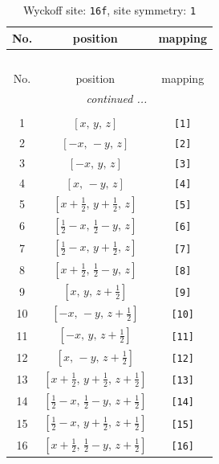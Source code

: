 \documentclass[fleqn,8pt]{jsarticle}
\begin{document}
\begin{longtable}{ccc}
\caption{Wyckoff site: {\tt 16f}, site symmetry: {\tt 1}}
 \\
 \hline \hline
No. & position & mapping \\ \hline \endfirsthead

\multicolumn{2}{l}{\tablename\ \thetable{}} \\
 \hline \hline
No. & position & mapping \\ \hline \endhead

 \hline \hline
\multicolumn{2}{r}{\footnotesize\it continued ...} \\ \endfoot

 \hline \hline
\multicolumn{2}{r}{} \\ \endlastfoot

1 & $\left[ x,\, y,\, z \right]$ & {\tt [1]} \\ \hline
2 & $\left[ - x,\, - y,\, z \right]$ & {\tt [2]} \\ \hline
3 & $\left[ - x,\, y,\, z \right]$ & {\tt [3]} \\ \hline
4 & $\left[ x,\, - y,\, z \right]$ & {\tt [4]} \\ \hline
5 & $\left[ x + \frac{1}{2},\, y + \frac{1}{2},\, z \right]$ & {\tt [5]} \\ \hline
6 & $\left[ \frac{1}{2} - x,\, \frac{1}{2} - y,\, z \right]$ & {\tt [6]} \\ \hline
7 & $\left[ \frac{1}{2} - x,\, y + \frac{1}{2},\, z \right]$ & {\tt [7]} \\ \hline
8 & $\left[ x + \frac{1}{2},\, \frac{1}{2} - y,\, z \right]$ & {\tt [8]} \\ \hline
9 & $\left[ x,\, y,\, z + \frac{1}{2} \right]$ & {\tt [9]} \\ \hline
10 & $\left[ - x,\, - y,\, z + \frac{1}{2} \right]$ & {\tt [10]} \\ \hline
11 & $\left[ - x,\, y,\, z + \frac{1}{2} \right]$ & {\tt [11]} \\ \hline
12 & $\left[ x,\, - y,\, z + \frac{1}{2} \right]$ & {\tt [12]} \\ \hline
13 & $\left[ x + \frac{1}{2},\, y + \frac{1}{2},\, z + \frac{1}{2} \right]$ & {\tt [13]} \\ \hline
14 & $\left[ \frac{1}{2} - x,\, \frac{1}{2} - y,\, z + \frac{1}{2} \right]$ & {\tt [14]} \\ \hline
15 & $\left[ \frac{1}{2} - x,\, y + \frac{1}{2},\, z + \frac{1}{2} \right]$ & {\tt [15]} \\ \hline
16 & $\left[ x + \frac{1}{2},\, \frac{1}{2} - y,\, z + \frac{1}{2} \right]$ & {\tt [16]} \\
\end{longtable}
\end{document}
